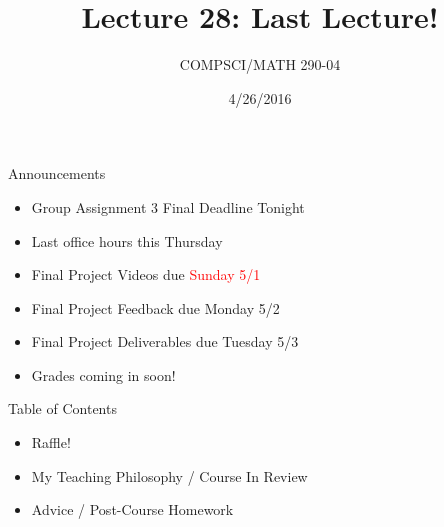 \documentclass{beamer}
\title{Lecture 28: Last Lecture!}
\date{4/26/2016}
\institute{Chris Tralie, Duke University}
\author{COMPSCI/MATH 290-04}
\begin{document}
\frame{\titlepage}

\begin{frame}{Announcements}
\begin{itemize}[label=$\vartriangleright$]

\item Group Assignment 3 Final Deadline Tonight

\item Last office hours this Thursday

\item Final Project Videos due \textcolor{red}{Sunday 5/1}

\item Final Project Feedback due Monday 5/2

\item Final Project Deliverables due Tuesday 5/3

\item Grades coming in soon!

\end{itemize}

\end{frame}


\begin{frame}{Table of Contents}

\begin{itemize}[label=$\blacktriangleright$]
	\item Raffle!
\end{itemize}

\begin{itemize}[label=$\vartriangleright$]
	\item My Teaching Philosophy / Course In Review
\end{itemize}


\begin{itemize}[label=$\vartriangleright$]
	\item Advice / Post-Course Homework
\end{itemize}

\end{frame}
\end{document}
